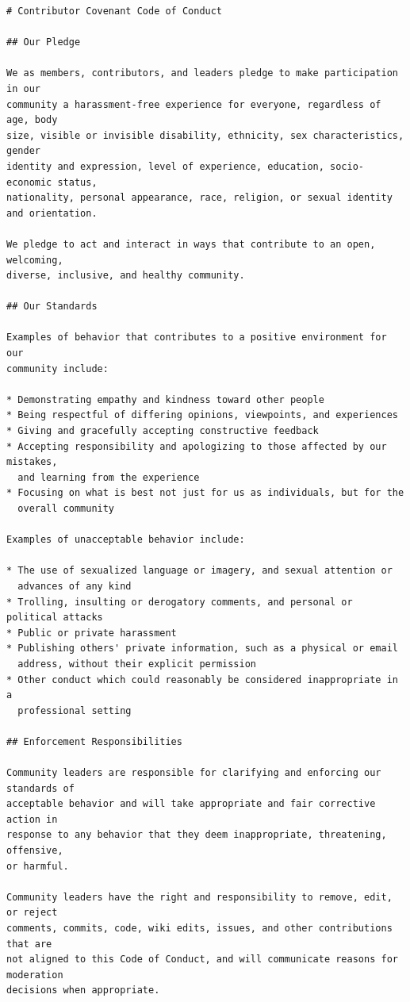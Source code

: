 \documentclass[
]{krantz}
\begin{document}
\begin{verbatim}
# Contributor Covenant Code of Conduct

## Our Pledge

We as members, contributors, and leaders pledge to make participation in our
community a harassment-free experience for everyone, regardless of age, body
size, visible or invisible disability, ethnicity, sex characteristics, gender
identity and expression, level of experience, education, socio-economic status,
nationality, personal appearance, race, religion, or sexual identity
and orientation.

We pledge to act and interact in ways that contribute to an open, welcoming,
diverse, inclusive, and healthy community.

## Our Standards

Examples of behavior that contributes to a positive environment for our
community include:

* Demonstrating empathy and kindness toward other people
* Being respectful of differing opinions, viewpoints, and experiences
* Giving and gracefully accepting constructive feedback
* Accepting responsibility and apologizing to those affected by our mistakes,
  and learning from the experience
* Focusing on what is best not just for us as individuals, but for the
  overall community

Examples of unacceptable behavior include:

* The use of sexualized language or imagery, and sexual attention or
  advances of any kind
* Trolling, insulting or derogatory comments, and personal or political attacks
* Public or private harassment
* Publishing others' private information, such as a physical or email
  address, without their explicit permission
* Other conduct which could reasonably be considered inappropriate in a
  professional setting

## Enforcement Responsibilities

Community leaders are responsible for clarifying and enforcing our standards of
acceptable behavior and will take appropriate and fair corrective action in
response to any behavior that they deem inappropriate, threatening, offensive,
or harmful.

Community leaders have the right and responsibility to remove, edit, or reject
comments, commits, code, wiki edits, issues, and other contributions that are
not aligned to this Code of Conduct, and will communicate reasons for moderation
decisions when appropriate.


\end{verbatim}
\end{document}
